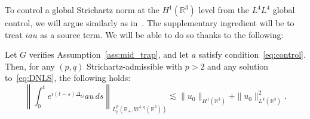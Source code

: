 \documentclass[AHL,Unicode,longabstracts,published]{cedram}
\newcommand*\R{\mathbb{R}}
\begin{document}
To control a global Strichartz norm at the $H^1(\R ^3)$ level from the $L^4 L^4$ global control, we will argue similarly as in~\cite{CoKeStTaTa04}. The supplementary ingredient will be to treat $iau$ as a source term. We will be able to do so thanks to the following:

\begin{lemm}
Let $G$ verifies Assumption~\ref{ass:mid_trap}, and let $a$ satisfy condition~\eqref{eq:control}. Then, for any $(p,q)$ Strichartz-admissible with $p>2$ and any solution to~\eqref{eq:DNLS}, the following holds:
\begin{equation}\label{eqB}
\left\| \int_0^t e^{i(t-s)\Delta_G} a u \, ds \right\|_{L_t^p\left(\R_+, W^{1,q}(\R^3)\right)} \lesssim \| u_0 \|_{H^1(\R^3)} + \| u_0 \|^2_{L^4(\R^3)}.
\end{equation}
\end{lemm}
\end{document}
